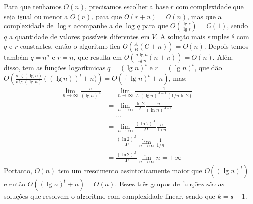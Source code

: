 Para que tenhamos $O(n)$, precisamos escolher a base $r$ com complexidade que seja igual ou menor a $O(n)$, para que $O(r+n) = O(n)$,
mas que a complexidade de $\log r$ acompanhe a de $\log q$ para que $O\left(\frac{\lg q}{\lg r}\right) = O(1)$,
sendo $q$ a quantidade de valores possíveis diferentes em $V$.
A solução mais simples é com $q$ e $r$ constantes, então o algoritmo fica $O\left(\frac{A}{B}(C+n)\right) = O(n)$.
Depois temos também $q = n^a$ e $r = n$, que resulta em
$O\left(\frac{a \lg n}{\lg n}(n + n)\right) = O(n)$.
Além disso, tem as funções logarítmicas $q = (\lg n)^s$ e $r = (\lg n)^t$,
que dão $O\left(\frac{s\lg(\lg n)}{t\lg(\lg n)}((\lg n))^t + n)\right)
= O((\lg n)^t + n)$, mas:
\begin{align*}
    \lim_{n\to\infty} \frac{n}{(\lg n)^A}
    &= \lim_{n\to\infty} \frac{1}{A\ (\lg n)^{A-1}\ (1/n \ln 2)} \\
    &= \lim_{n\to\infty} \frac{\ln 2}{A} \frac{n}{(\ln n)^{A-1}} \\
    &\ \ \ \ \ \ ...\\
    &= \lim_{n\to\infty} \frac{(\ln 2)^A}{A!} \frac{n}{\ln n} \\
    &= \frac{(\ln 2)^A}{A!} \lim_{n\to\infty} \frac{1}{1/n} \\
    &= \frac{(\ln 2)^A}{A!} \lim_{n\to\infty} n = +\infty
\end{align*}
Portanto, $O(n)$ tem um crescimento assintoticamente maior que $O((\lg n)^t)$ e então $O((\lg n)^t + n) = O(n)$.
Esses três grupos de funções são as soluções que resolvem o algoritmo com complexidade linear, sendo que $k = q - 1$.